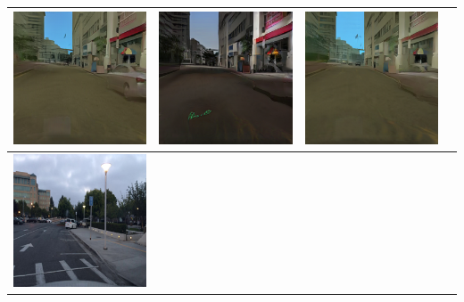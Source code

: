 \documentclass{VUMIFPSkursinis}
\begin{document}
\begin{table}[H]
{\begin{tabular}{|c|c|c|c|}
                \includegraphics[scale=0.35]{img/pvz/6_cycle} & \includegraphics[scale=0.35]{img/pvz/6_cut} & \includegraphics[scale=0.35]{img/pvz/6_mspc}
                \\
                \hline
                \includegraphics[scale=0.35]{img/pvz/7_real} & 

\end{tabular}}
\end{table}
\end{document}
